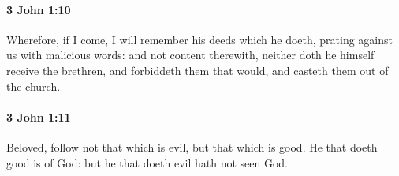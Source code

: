 		\paragraph{3 John 1:10} %
			\label{3JOHN-1-10}

			Wherefore, if I come, I will remember his deeds which he doeth, prating against us with malicious words: and not content therewith, neither doth he himself receive the brethren, and forbiddeth them that would, and casteth them out of the church.

			\begin{framed}
			\scriptsize
				\begin{compactdesc}
					\item[SBLG] 
				\end{compactdesc}
			\end{framed}

		\paragraph{3 John 1:11} %
			\label{3JOHN-1-11}

			Beloved, follow not that which is evil, but that which is good.  He that doeth good is of God: but he that doeth evil hath not seen God.

